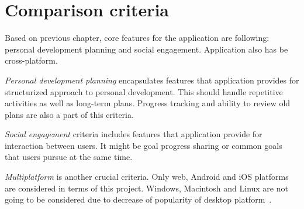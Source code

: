 
\section{Comparison criteria}\label{sec:comparison-criteria}



Based on previous chapter, core features for the application are following: personal development planning and social engagement.
Application also has be cross-platform.

\textit{Personal development planning} encapsulates features that application provides for structurized approach to personal development.
This should handle repetitive activities as well as long-term plans.
Progress tracking and ability to review old plans are also a part of this criteria.

\textit{Social engagement} criteria includes features that application provide for interaction between users.
It might be goal progress sharing or common goals that users pursue at the same time.

\textit{Multiplatform} is another crucial criteria.
Only web, Android and iOS platforms are considered in terms of this project.
Windows, Macintosh and Linux are not going to be considered due to decrease of popularity of desktop platform~\cite{mobile-vs-desktop}.

